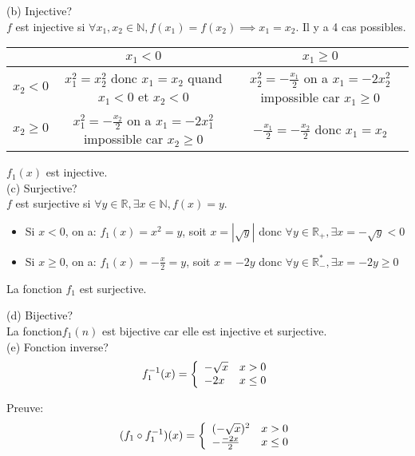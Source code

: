 \documentclass[]{book}
\theoremstyle{definition}
\newcommand{\bb}[1]{\mathbb{#1}}
\newcommand{\R}{\bb{R}}
\begin{document}
(b) Injective?\\
$f$ est injective si $\forall x_1, x_2 \in \mathbb{N}, f(x_1) = f(x_2) \implies x_1 = x_2$. Il y a 4 cas possibles.

\begin{center}
\begin{tabular}{c|c|c} 
                 & $x_1 < 0$ & $x_1 \ge 0$ \\
      \hline
     $x_2 < 0$   & $x_1^2 = x_2^2$ donc $x_1=x_2$ quand $x_1 <0$ et $x_2 < 0$ & $x_2^2 = -\frac{x_1}{2}$ on a $x_1=-2x_2^2$  impossible car $x_1 \ge 0$\\
      \hline
     $x_2 \ge 0$ & $x_1^2 = -\frac{x_2}{2}$ on a $x_1=-2x_1^2$  impossible car $x_2 \ge 0$ & $-\frac{x_1}{2} = -\frac{x_2}{2}$ donc $x_1=x_2$\\
\end{tabular}
\end{center}
$f_1(x)$ est injective.\\

(c) Surjective?\\
$f$ est surjective si $\forall y \in \mathbb{R}, \exists x \in \mathbb{N}, f(x) = y$.\\
\begin{itemize}
\item Si $x < 0$, on a: 
$ f_1(x) = x^2 = y$, soit $x=|\sqrt{y}|$ donc $\forall y \in \R_{+}, \exists x = -\sqrt{y} < 0$
\item Si $x \ge 0$, on a:
$f_1(x) = -\frac{x}{2}=y$, soit $x= -2y$ donc $\forall y \in \R_{-}^{*}, \exists x = -2y \ge 0$
\end{itemize}
La fonction $f_1$ est surjective.

(d) Bijective?\\
La fonction$f_1(n)$ est bijective car elle est injective et surjective.\\

(e) Fonction inverse?\\
$$f_1^{-1}(x) = 
\left\{ 
\begin{array}{l l}
 -\sqrt{x} & x > 0\\
 -2x & x \le 0\\
\end{array}
\right. 
$$

Preuve:
$$(f_1 \circ f_1^{-1})(x) =
\left\{ 
\begin{array}{l l}
 (-\sqrt{x})^2 & x > 0\\
 -\frac{-2x}{2} & x \le 0\\
\end{array}
\right. 
$$
\end{document}
